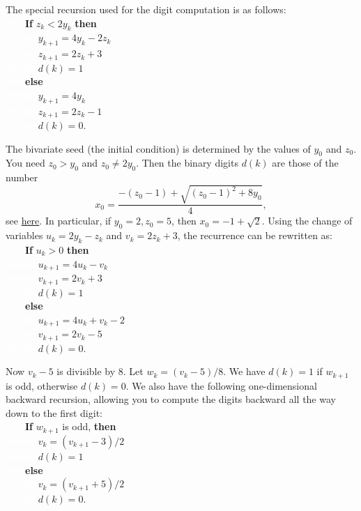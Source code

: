 \documentclass[oneside,10pt]{book}
\begin{document}
\noindent The special recursion used for the digit computation is as follows:  \vspace{1ex} \\
\noindent  \textcolor{white}{0000}{\bf If}  $ z_k  <2y_k$   {\bf then}   \\
  \textcolor{white}{000000}  $y_{k+1}=4y_k-2z_k$\\
 \textcolor{white}{000000} $z_{k+1}=2z_k+3$\\
 \textcolor{white}{000000} $d(k)=1$ \\
\textcolor{white}{0000}{\bf else} \\
\textcolor{white}{000000} $ y_{k+1}=4y_k$\\
\textcolor{white}{000000} $ z_{k+1}=2z_k-1$\\
\textcolor{white}{000000} $ d(k)=0$.

\noindent The bivariate seed (the initial condition) is determined by the values of $y_0$ and $z_0$. You need $z_0>y_0$ and $z_0\neq 2y_0$. Then the binary digits $d(k)$ are those of the number
 $$x_0 = \frac{-(z_0-1) + \sqrt{(z_0-1)^2+8y_0}}{4},$$
see \href{https://mltblog.com/3REtOB9}{here}. In particular, if $y_0=2, z_0=5$, then $x_0=-1+\sqrt{2}$. Using the change of variables
  $u_k=2y_k-z_k$ and $v_k = 2z_k+3$, the recurrence can be rewritten as: \vspace{1ex} \\


\noindent  \textcolor{white}{0000}{\bf If}  $ u_k>0$   {\bf then}   \\
  \textcolor{white}{000000} $u_{k+1}=4u_k -v_k$ \\
 \textcolor{white}{000000} $v_{k+1} = 2v_k + 3$\\
 \textcolor{white}{000000} $d(k)=1$\\
\textcolor{white}{0000}{\bf else} \\
\textcolor{white}{000000} $u_{k+1}=4u_k + v_k-2$\\
\textcolor{white}{000000} $v_{k+1} = 2v_k-5$\\
\textcolor{white}{000000} $ d(k)=0$.

\noindent Now $v_k-5$ is divisible by $8$. Let $w_k=(v_k-5)/8$. We have $d(k)=1$ if $w_{k+1}$ is odd, otherwise $d(k)=0$. We also have the
 following one-dimensional backward recursion, allowing you to compute the digits backward all the way down to the first digit:\vspace{1ex} \\
\noindent  \textcolor{white}{0000}{\bf If}  $w_{k+1}$ is odd,  {\bf then}   \\
 \textcolor{white}{000000} $v_{k} = (v_{k+1} -3)/2$\\
\textcolor{white}{000000} $d(k)=1$\\
\textcolor{white}{0000}{\bf else} \\
\textcolor{white}{000000} $v_{k} = (v_{k+1}+5)/2$\\
\textcolor{white}{000000} $d(k)=0$.
\end{document}
